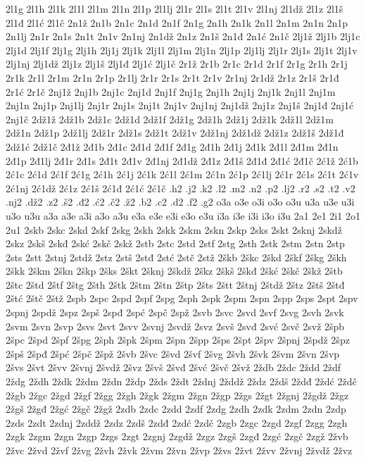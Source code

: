 {2l1g
2l1h
2l1k
2l1l
2l1m
2l1n
2l1p
2l1lj
2l1r
2l1s
2l1t
2l1v
2l1nj
2l1dž
2l1z
2l1š
2l1đ
2l1ć
2l1č
2n1ž
2n1b
2n1c
2n1d
2n1f
2n1g
2n1h
2n1k
2n1l
2n1m
2n1n
2n1p
2n1lj
2n1r
2n1s
2n1t
2n1v
2n1nj
2n1dž
2n1z
2n1š
2n1đ
2n1ć
2n1č
2lj1ž
2lj1b
2lj1c
2lj1d
2lj1f
2lj1g
2lj1h
2lj1j
2lj1k
2lj1l
2lj1m
2lj1n
2lj1p
2lj1lj
2lj1r
2lj1s
2lj1t
2lj1v
2lj1nj
2lj1dž
2lj1z
2lj1š
2lj1đ
2lj1ć
2lj1č
2r1ž
2r1b
2r1c
2r1d
2r1f
2r1g
2r1h
2r1j
2r1k
2r1l
2r1m
2r1n
2r1p
2r1lj
2r1r
2r1s
2r1t
2r1v
2r1nj
2r1dž
2r1z
2r1š
2r1đ
2r1ć
2r1č
2nj1ž
2nj1b
2nj1c
2nj1d
2nj1f
2nj1g
2nj1h
2nj1j
2nj1k
2nj1l
2nj1m
2nj1n
2nj1p
2nj1lj
2nj1r
2nj1s
2nj1t
2nj1v
2nj1nj
2nj1dž
2nj1z
2nj1š
2nj1đ
2nj1ć
2nj1č
2dž1ž
2dž1b
2dž1c
2dž1d
2dž1f
2dž1g
2dž1h
2dž1j
2dž1k
2dž1l
2dž1m
2dž1n
2dž1p
2dž1lj
2dž1r
2dž1s
2dž1t
2dž1v
2dž1nj
2dž1dž
2dž1z
2dž1š
2dž1đ
2dž1ć
2dž1č
2đ1ž
2đ1b
2đ1c
2đ1d
2đ1f
2đ1g
2đ1h
2đ1j
2đ1k
2đ1l
2đ1m
2đ1n
2đ1p
2đ1lj
2đ1r
2đ1s
2đ1t
2đ1v
2đ1nj
2đ1dž
2đ1z
2đ1š
2đ1đ
2đ1ć
2đ1č
2ć1ž
2ć1b
2ć1c
2ć1d
2ć1f
2ć1g
2ć1h
2ć1j
2ć1k
2ć1l
2ć1m
2ć1n
2ć1p
2ć1lj
2ć1r
2ć1s
2ć1t
2ć1v
2ć1nj
2ć1dž
2ć1z
2ć1š
2ć1đ
2ć1ć
2ć1č
.h2
.j2
.k2
.l2
.m2
.n2
.p2
.lj2
.r2
.s2
.t2
.v2
.nj2
.dž2
.z2
.š2
.đ2
.ć2
.č2
.ž2
.b2
.c2
.d2
.f2
.g2
o3a
o3e
o3i
o3o
o3u
u3a
u3e
u3i
u3o
u3u
a3a
a3e
a3i
a3o
a3u
e3a
e3e
e3i
e3o
e3u
i3a
i3e
i3i
i3o
i3u
2a1
2e1
2i1
2o1
2u1
2skb
2skc
2skd
2skf
2skg
2skh
2skk
2skm
2skn
2skp
2sks
2skt
2sknj
2skdž
2skz
2skš
2skđ
2skć
2skč
2skž
2stb
2stc
2std
2stf
2stg
2sth
2stk
2stm
2stn
2stp
2sts
2stt
2stnj
2stdž
2stz
2stš
2stđ
2stć
2stč
2stž
2škb
2škc
2škd
2škf
2škg
2škh
2škk
2škm
2škn
2škp
2šks
2škt
2šknj
2škdž
2škz
2škš
2škđ
2škć
2škč
2škž
2štb
2štc
2štd
2štf
2štg
2šth
2štk
2štm
2štn
2štp
2šts
2štt
2štnj
2štdž
2štz
2štš
2štđ
2štć
2štč
2štž
2spb
2spc
2spd
2spf
2spg
2sph
2spk
2spm
2spn
2spp
2sps
2spt
2spv
2spnj
2spdž
2spz
2spš
2spđ
2spć
2spč
2spž
2svb
2svc
2svd
2svf
2svg
2svh
2svk
2svm
2svn
2svp
2svs
2svt
2svv
2svnj
2svdž
2svz
2svš
2svđ
2svć
2svč
2svž
2špb
2špc
2špd
2špf
2špg
2šph
2špk
2špm
2špn
2špp
2šps
2špt
2špv
2špnj
2špdž
2špz
2špš
2špđ
2špć
2špč
2špž
2švb
2švc
2švd
2švf
2švg
2švh
2švk
2švm
2švn
2švp
2švs
2švt
2švv
2švnj
2švdž
2švz
2švš
2švđ
2švć
2švč
2švž
2ždb
2ždc
2ždd
2ždf
2ždg
2ždh
2ždk
2ždm
2ždn
2ždp
2žds
2ždt
2ždnj
2žddž
2ždz
2ždš
2ždđ
2ždć
2ždč
2žgb
2žgc
2žgd
2žgf
2žgg
2žgh
2žgk
2žgm
2žgn
2žgp
2žgs
2žgt
2žgnj
2žgdž
2žgz
2žgš
2žgđ
2žgć
2žgč
2žgž
2zdb
2zdc
2zdd
2zdf
2zdg
2zdh
2zdk
2zdm
2zdn
2zdp
2zds
2zdt
2zdnj
2zddž
2zdz
2zdš
2zdđ
2zdć
2zdč
2zgb
2zgc
2zgd
2zgf
2zgg
2zgh
2zgk
2zgm
2zgn
2zgp
2zgs
2zgt
2zgnj
2zgdž
2zgz
2zgš
2zgđ
2zgć
2zgč
2zgž
2žvb
2žvc
2žvd
2žvf
2žvg
2žvh
2žvk
2žvm
2žvn
2žvp
2žvs
2žvt
2žvv
2žvnj
2žvdž
2žvz
}

